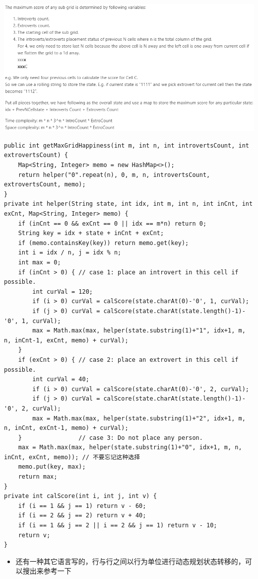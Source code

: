 \documentclass[9pt, b5paaper]{book}
\begin{document}
\includegraphics[width=.9\linewidth]{./pic/happiness2.png} 
\begin{verbatim}
public int getMaxGridHappiness(int m, int n, int introvertsCount, int extrovertsCount) {
    Map<String, Integer> memo = new HashMap<>();
    return helper("0".repeat(n), 0, m, n, introvertsCount, extrovertsCount, memo);
}
private int helper(String state, int idx, int m, int n, int inCnt, int exCnt, Map<String, Integer> memo) {
    if (inCnt == 0 && exCnt == 0 || idx == m*n) return 0;
    String key = idx + state + inCnt + exCnt;
    if (memo.containsKey(key)) return memo.get(key);
    int i = idx / n, j = idx % n;
    int max = 0;
    if (inCnt > 0) { // case 1: place an introvert in this cell if possible.
        int curVal = 120;
        if (i > 0) curVal = calScore(state.charAt(0)-'0', 1, curVal);
        if (j > 0) curVal = calScore(state.charAt(state.length()-1)-'0', 1, curVal);
        max = Math.max(max, helper(state.substring(1)+"1", idx+1, m, n, inCnt-1, exCnt, memo) + curVal);
    }
    if (exCnt > 0) { // case 2: place an extrovert in this cell if possible.
        int curVal = 40;
        if (i > 0) curVal = calScore(state.charAt(0)-'0', 2, curVal);
        if (j > 0) curVal = calScore(state.charAt(state.length()-1)-'0', 2, curVal);
        max = Math.max(max, helper(state.substring(1)+"2", idx+1, m, n, inCnt, exCnt-1, memo) + curVal);
    }                // case 3: Do not place any person.
    max = Math.max(max, helper(state.substring(1)+"0", idx+1, m, n, inCnt, exCnt, memo)); // 不要忘记这种选择
    memo.put(key, max);
    return max;
}
private int calScore(int i, int j, int v) {
    if (i == 1 && j == 1) return v - 60;
    if (i == 2 && j == 2) return v + 40;
    if (i == 1 && j == 2 || i == 2 && j == 1) return v - 10;
    return v;
}
\end{verbatim}
\begin{itemize}
\item 还有一种其它语言写的，行与行之间以行为单位进行动态规划状态转移的，可以搜出来参考一下
\end{itemize}
\end{document}
